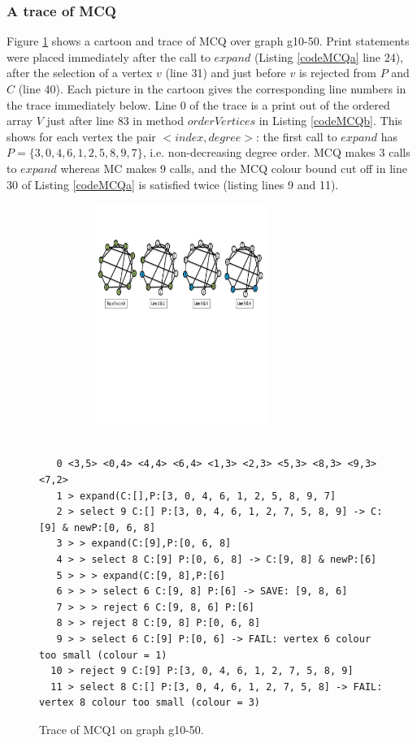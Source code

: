 \documentclass{l4proj}
\begin{document}
\subsubsection{A trace of MCQ}
Figure \ref{traceMCQ} shows a cartoon and trace of MCQ over graph g10-50. Print statements were placed immediately after the call to 
$expand$ (Listing \ref{codeMCQa} line 24), after the selection of a vertex $v$ (line 31) and just before $v$ is rejected from
$P$ and $C$ (line 40). Each picture in the cartoon gives the corresponding line numbers in the trace immediately below.
Line 0 of the trace is a print out of the ordered array $V$ just after line 83 in method $orderVertices$ in
Listing \ref{codeMCQb}. This shows for each vertex the pair $<index,degree>$: the first call to 
$expand$ has $P = \{3,0,4,6,1,2,5,8,9,7\}$, i.e. non-decreasing degree order. MCQ makes 3 calls to $expand$
whereas MC makes 9 calls, and the MCQ colour bound
cut off in line 30 of Listing \ref{codeMCQa} is satisfied twice (listing lines 9 and 11).

\begin{figure}
\centering
\includegraphics[height=7.2cm,width=9.2cm]{mcqTrace.pdf}
\vspace{-40mm}

\begin{scriptsize}
\begin{verbatim}

   0 <3,5> <0,4> <4,4> <6,4> <1,3> <2,3> <5,3> <8,3> <9,3> <7,2> 
   1 > expand(C:[],P:[3, 0, 4, 6, 1, 2, 5, 8, 9, 7]
   2 > select 9 C:[] P:[3, 0, 4, 6, 1, 2, 7, 5, 8, 9] -> C:[9] & newP:[0, 6, 8]
   3 > > expand(C:[9],P:[0, 6, 8]
   4 > > select 8 C:[9] P:[0, 6, 8] -> C:[9, 8] & newP:[6]
   5 > > > expand(C:[9, 8],P:[6]
   6 > > > select 6 C:[9, 8] P:[6] -> SAVE: [9, 8, 6]
   7 > > > reject 6 C:[9, 8, 6] P:[6]
   8 > > reject 8 C:[9, 8] P:[0, 6, 8]
   9 > > select 6 C:[9] P:[0, 6] -> FAIL: vertex 6 colour too small (colour = 1)
  10 > reject 9 C:[9] P:[3, 0, 4, 6, 1, 2, 7, 5, 8, 9]
  11 > select 8 C:[] P:[3, 0, 4, 6, 1, 2, 7, 5, 8] -> FAIL: vertex 8 colour too small (colour = 3)

\end{verbatim}
\end{scriptsize}
\vspace{-5mm}
\caption{Trace of MCQ1 on graph g10-50.}
\label{traceMCQ}
\end{figure}
\end{document}
